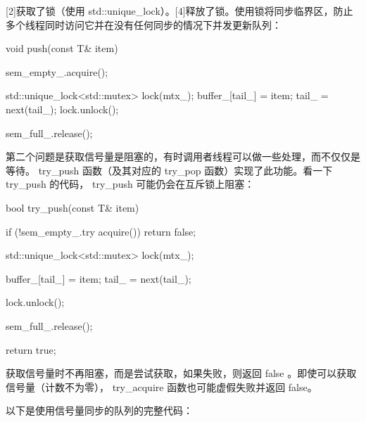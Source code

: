 [2]获取了锁（使用 std::unique\_lock）。[4]释放了锁。使用锁将同步临界区，防止多个线程同时访问它并在没有任何同步的情况下并发更新队列：

\begin{cpp}
void push(const T& item)
{
    sem_empty_.acquire();

    std::unique_lock<std::mutex> lock(mtx_);
    buffer_[tail_] = item;
    tail_ = next(tail_);
    lock.unlock();

    sem_full_.release();
}
\end{cpp}

第二个问题是获取信号量是阻塞的，有时调用者线程可以做一些处理，而不仅仅是等待。 try\_push 函数（及其对应的 try\_pop 函数）实现了此功能。看一下 try\_push 的代码， try\_push 可能仍会在互斥锁上阻塞：

\begin{cpp}
bool try_push(const T& item) {
    if (!sem_empty_.try acquire()) {
        return false;
    }

    std::unique_lock<std::mutex> lock(mtx_);

    buffer_[tail_] = item;
    tail_ = next(tail_);

    lock.unlock();

    sem_full_.release();

    return true;
}
\end{cpp}

获取信号量时不再阻塞，而是尝试获取，如果失败，则返回 false 。即使可以获取信号量（计数不为零）， try\_acquire 函数也可能虚假失败并返回 false。

以下是使用信号量同步的队列的完整代码：

